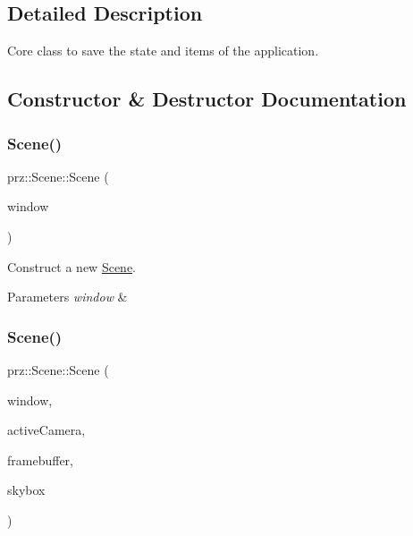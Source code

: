 \subsection{Detailed Description}
Core class to save the state and items of the application. 



\subsection{Constructor \& Destructor Documentation}
\mbox{\label{classprz_1_1_scene_a99d23e99f8f47fdf4e6bd698d7615121}} 
\subsubsection{\texorpdfstring{Scene()}{Scene()}\hspace{0.1cm}{\footnotesize\ttfamily [1/2]}}
{\footnotesize\ttfamily prz\+::\+Scene\+::\+Scene (\begin{DoxyParamCaption}\item[{Window \&}]{window }\end{DoxyParamCaption})}



Construct a new \mbox{\hyperlink{classprz_1_1_scene}{Scene}}. 


\begin{DoxyParams}{Parameters}
{\em window} & \\
\hline
\end{DoxyParams}
\mbox{\label{classprz_1_1_scene_aad3da8080dd5063fc76f94285b027e13}} 
\subsubsection{\texorpdfstring{Scene()}{Scene()}\hspace{0.1cm}{\footnotesize\ttfamily [2/2]}}
{\footnotesize\ttfamily prz\+::\+Scene\+::\+Scene (\begin{DoxyParamCaption}\item[{Window \&}]{window,  }\item[{P\+S\+Ptr$<$ \mbox{\hyperlink{classprz_1_1_camera}{Camera}} $>$}]{active\+Camera,  }\item[{P\+S\+Ptr$<$ \mbox{\hyperlink{classprz_1_1_framebuffer}{Framebuffer}} $>$}]{framebuffer,  }\item[{P\+S\+Ptr$<$ \mbox{\hyperlink{classprz_1_1_skybox}{Skybox}} $>$}]{skybox }\end{DoxyParamCaption})}



